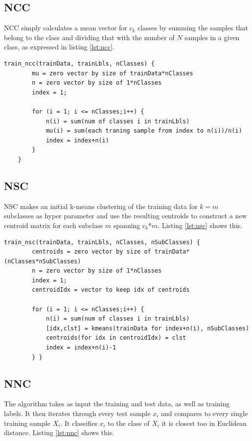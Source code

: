 \documentclass[journal]{IEEEtran}
\begin{document}
\subsection{NCC} 

NCC simply calculates a mean vector for $c_{k}$ classes by summing the samples that belong to the class and dividing that with the number of $N$ samples in a given class, as expressed in listing \ref{lst:ncc}.

\begin{lstlisting}[caption=Implementation of NCC., label={lst:ncc}]
	train_ncc(trainData, trainLbls, nClasses) {
		mu = zero vector by size of trainData*nClasses
		n = zero vector by size of 1*nClasses
		index = 1;
		
		for (i = 1; i <= nClasses;i++) {
			n(i) = sum(num of classes i in trainLbls)
			mu(i) = sum(each traning sample from index to n(i))/n(i)		
			index = index+n(i)
		}
	}
\end{lstlisting}

\subsection{NSC} 

NSC makes an initial k-means clustering of the training data for $k=m$ subclasses as hyper parameter and use the resulting centroids to construct a new centroid matrix for each subclass $m$ spanning $c_{k}$*$m$. Listing \ref{lst:nsc} shows this.

\begin{lstlisting}[caption=Implementation of NSC., label={lst:nsc}]
	train_nsc(trainData, trainLbls, nClasses, nSubClasses) {
		centroids = zero vector by size of trainData*(nClasses*nSubClasses)
		n = zero vector by size of 1*nClasses
		index = 1;
		centroidIdx = vector to keep idx of centroids
	
		for (i = 1; i <= nClasses;i++) {
			n(i) = sum(num of classes i in trainLbls)
			[idx,clst] = kmeans(trainData for index+n(i), nSubClasses)
			centroids(for idx in centroidIdx) = clst
			index = index+n(i)-1
		} }
\end{lstlisting}

\subsection{NNC}

The algorithm takes as input the training and test data, as well as training labels. It then iterates through every test sample $x_i$ and compares to every single training sample $X_{i}$. It classifies $x_i$ to the class of $X_{i}$ it is closest too in Euclidean distance. Listing \ref{lst:nnc} shows this.
\end{document}
